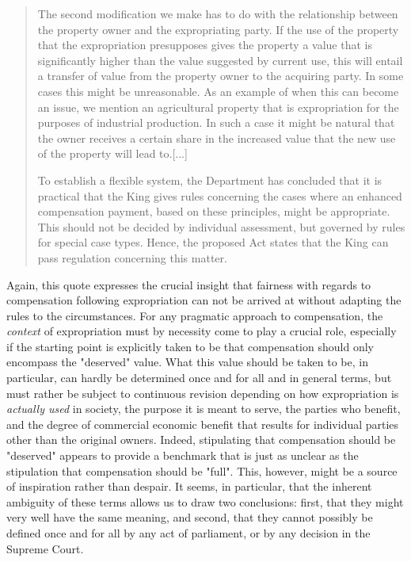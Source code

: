 \begin{quote}
The second modification we make has to do with the relationship between the property owner and the expropriating party. If the use of the property that the expropriation presupposes gives the property a value that is significantly higher than the value suggested by current use, this will entail a transfer of value from the property owner to the acquiring party. In some cases this might be unreasonable. As an example of when this can become an issue, we mention an agricultural property that is expropriation for the purposes of industrial production. In such a case it might be natural that the owner receives a certain share in the increased value that the new use of the property will lead to.[...] %

To establish a flexible system, the Department has concluded that it is practical that the King gives rules concerning the cases where an enhanced compensation payment, based on these principles, might be appropriate. This should not be decided by individual assessment, but governed by rules for special case types. Hence, the proposed Act states that the King can pass regulation concerning this matter.
\end{quote}

Again, this quote expresses the crucial insight that fairness with regards to compensation following expropriation can not be arrived at without adapting the rules to the circumstances. For any pragmatic approach to compensation, the \emph{context} of expropriation must by necessity come to play a crucial role, especially if the starting point is explicitly taken to be that compensation should only encompass the "deserved" value. What this value should be taken to be, in particular, can hardly be determined once and for all and in general terms, but must rather be subject to continuous revision depending on how expropriation is \emph{actually used} in society, the purpose it is meant to serve, the parties who benefit, and the degree of commercial economic benefit that results for individual parties other than the original owners. Indeed, stipulating that compensation should be "deserved" appears to provide a benchmark that is just as unclear as the stipulation that compensation should be "full". This, however, might be a source of inspiration rather than despair. It seems, in particular, that the inherent ambiguity of these terms allows us to draw two conclusions: first, that they might very well have the same meaning, and second, that they cannot possibly be defined once 
and for all by any act of parliament, or by any decision in the Supreme Court.

